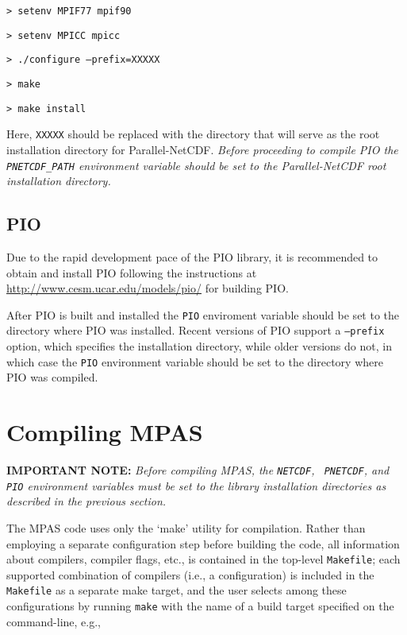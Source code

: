 {\tt > setenv MPIF77 mpif90} 

{\tt > setenv MPICC mpicc}  

{\tt > ./configure --prefix=XXXXX} 

{\tt > make}

{\tt > make install}
\vspace{12pt}

Here, {\tt XXXXX} should be replaced with the directory that will serve as the
root installation directory for Parallel-NetCDF.  {\em Before proceeding to
compile PIO the {\tt PNETCDF\_PATH} environment variable should be set to the
Parallel-NetCDF root installation directory.}


\subsection{PIO}
\label{pio_build}

Due to the rapid development pace of the PIO library, it is recommended to
obtain and install PIO following the instructions at
\url{http://www.cesm.ucar.edu/models/pio/} for building PIO.

After PIO is built and installed the {\tt PIO} enviroment variable should be set to 
the directory where PIO was installed. Recent versions of PIO support a {\tt --prefix}
option, which specifies the installation directory, while older versions do not,
in which case the {\tt PIO} environment variable should be set to the directory where
PIO was compiled.

\section{Compiling MPAS}
\label{compiling_MPAS}

{\bf IMPORTANT NOTE:} {\em Before compiling MPAS, the {\tt NETCDF}, {\tt
PNETCDF}, and {\tt PIO} environment variables must be set to the library
installation directories as described in the previous section.} \vspace{12pt}

The MPAS code uses only the `make' utility for compilation. Rather than
employing a separate configuration step before building the code, all
information about compilers, compiler flags, etc., is contained in the top-level
{\tt Makefile}; each supported combination of compilers (i.e., a configuration)
is included in the {\tt Makefile} as a separate make target, and the user
selects among these configurations by running {\tt make} with the name of a
build target specified on the command-line, e.g.,

